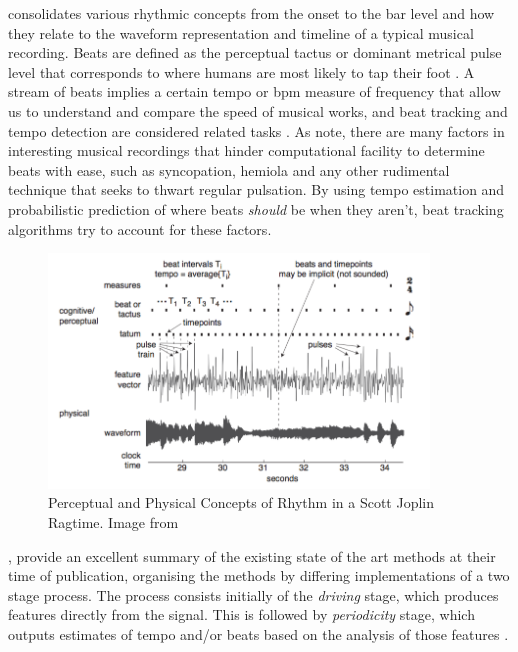 { consolidates various rhythmic concepts from the onset to the bar level and how they relate to the waveform representation and timeline of a typical musical recording. Beats are defined as the perceptual tactus or dominant metrical pulse level that corresponds to where humans are most likely to tap their foot \citep{Jehan2005, Ellis2007a, Stark2009}. A stream of beats implies a certain tempo or \acrlong{bpm} measure of frequency that allow us to understand and compare the speed of musical works, and beat tracking and tempo detection are considered related tasks \citep{McKinney2007}. As \cite{Korzeniowski2014} note, there are many factors in interesting musical recordings that hinder computational facility to determine beats with ease, such as syncopation, hemiola and any other rudimental technique that seeks to thwart regular pulsation. By using tempo estimation and probabilistic prediction of where beats \textit{should} be when they aren't, beat tracking algorithms try to account for these factors. 

\begin{figure}
	\begin{center}
		\includegraphics[width=0.9\textwidth]{ch05_pyconcat/figures/joplin.png}
	\end{center}
	\caption[Perceptual and Physical Concepts of Rhythm in a Scott Joplin Ragtime]{Perceptual and Physical Concepts of Rhythm in a Scott Joplin Ragtime. Image from \cite{Sethares2007}}
	\label{fig:beat_joplin}
\end{figure}

\cite{McKinney2007}, provide an excellent summary of the existing state of the art methods at their time of publication, organising the methods by differing implementations of a two stage process. The process consists initially of the \textit{driving} stage, which produces features directly from the signal. This is followed by \textit{periodicity} stage, which outputs estimates of tempo and/or beats based on the analysis of those features \citep{McKinney2007}.

}
